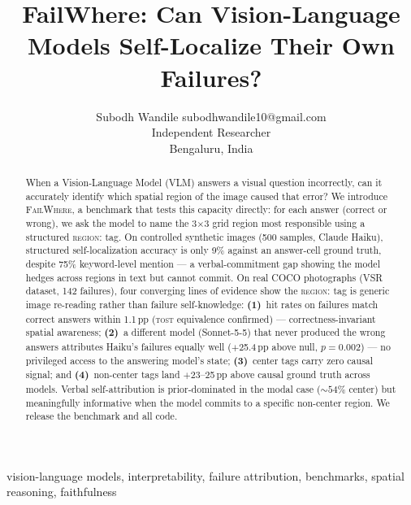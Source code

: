 \documentclass[twoside,11pt]{article}
\begin{document}
\title{FailWhere: Can Vision-Language Models Self-Localize Their Own Failures?}

\author{\name Subodh Wandile \email subodhwandile10@gmail.com \\
       \addr Independent Researcher\\
       Bengaluru, India}

\maketitle
\begin{abstract}
When a Vision-Language Model (VLM) answers a visual question incorrectly, can it
accurately identify which spatial region of the image caused that error?
We introduce \textsc{FailWhere}, a benchmark that tests this capacity directly:
for each answer (correct or wrong), we ask the model to name the 3$\times$3 grid
region most responsible using a structured \textsc{region:} tag.
On controlled synthetic images (500 samples, Claude Haiku), structured
self-localization accuracy is only 9\% against an answer-cell ground truth,
despite 75\% keyword-level mention — a verbal-commitment gap showing the model
hedges across regions in text but cannot commit.
On real COCO photographs (VSR dataset, 142 failures), four converging lines of
evidence show the \textsc{region:} tag is generic image re-reading rather than
failure self-knowledge:
\textbf{(1)}~hit rates on failures match correct answers within 1.1\,pp
(\textsc{tost} equivalence confirmed) — correctness-invariant spatial awareness;
\textbf{(2)}~a different model (Sonnet-5-5) that never produced the wrong answers
attributes Haiku's failures equally well ($+$25.4\,pp above null, $p{=}0.002$) —
no privileged access to the answering model's state;
\textbf{(3)}~center tags carry zero causal signal; and
\textbf{(4)}~non-center tags land $+$23--25\,pp above causal ground truth across
models.
Verbal self-attribution is prior-dominated in the modal case (${\sim}54\%$ center)
but meaningfully informative when the model commits to a specific non-center region.
We release the benchmark and all code.
\end{abstract}

\begin{keywords}
  vision-language models, interpretability, failure attribution,
  benchmarks, spatial reasoning, faithfulness
\end{keywords}



\end{document}
